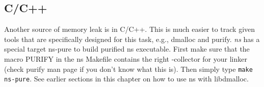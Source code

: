 \subsection{C/C++}
\label{leakC}

Another source of memory leak is in C/C++. This is much easier to track
given tools that are specifically designed for this task, e.g., dmalloc
and purify. \emph{ns}  has a special target ns-pure to build purified ns
executable. First make sure that the macro PURIFY in the ns Makefile
contains the right -collector for your linker (check purify man page if
you don't know what this is). Then simply type {\tt make ns-pure}. See
earlier sections in this chapter on how to use ns with libdmalloc. 



